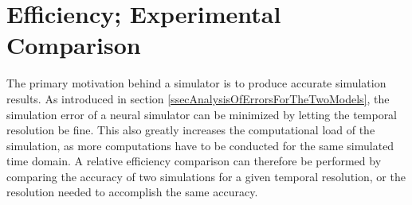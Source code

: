 \documentclass[b5paper,12 pt]{report}
\begin{document}


		
		
		



	
	\chapter{Efficiency; Experimental Comparison} %
	\label{chExperimentalEfficiencyMeasurement}
		The primary motivation behind a simulator is to produce accurate simulation results.
		As introduced in section \ref{ssecAnalysisOfErrorsForTheTwoModels}, the simulation error of a neural simulator can be minimized by letting the temporal resolution be fine.
		This also greatly increases the computational load of the simulation, as more computations have to be conducted for the same simulated time domain.
		A relative efficiency comparison can therefore be performed by comparing the accuracy of two simulations for a given temporal resolution, or the resolution needed to accomplish the same accuracy.
\end{document}
